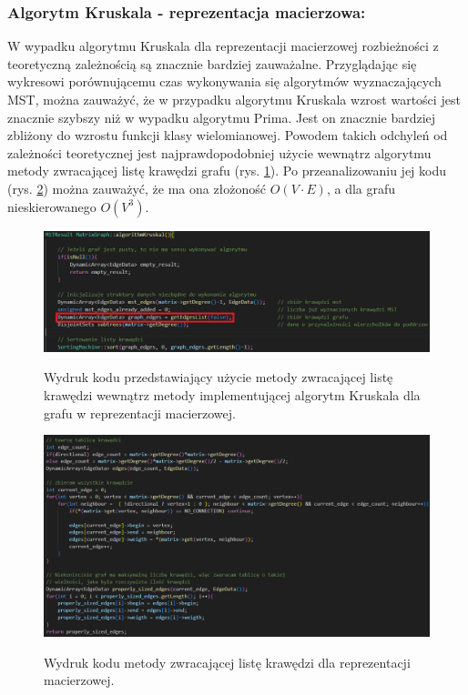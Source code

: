\documentclass[a4paper,12pt]{article}
\begin{document}
\subsubsection{Algorytm Kruskala - reprezentacja macierzowa:}
W wypadku algorytmu Kruskala dla reprezentacji macierzowej rozbieżności z teoretyczną zależnością są znacznie bardziej zauważalne. Przyglądając się wykresowi porównującemu czas wykonywania się algorytmów wyznaczających MST, można zauważyć, że w przypadku algorytmu Kruskala wzrost wartości jest znacznie szybszy niż w wypadku algorytmu Prima. Jest on znacznie bardziej zbliżony do wzrostu funkcji klasy wielomianowej. Powodem takich odchyleń od zależności teoretycznej jest najprawdopodobniej użycie wewnątrz algorytmu metody zwracającej listę krawędzi grafu (rys. \ref{fig.kruskal-macierz-wyjasnienie-1}). Po przeanalizowaniu jej kodu (rys. \ref{fig.kruskal-macierz-wyjasnienie-2}) można zauważyć, że ma ona złożoność $O(V \cdot E)$, a dla grafu nieskierowanego $O(V^3)$.
\begin{figure}[H]
	\centering
	\caption{\centering Wydruk kodu przedstawiający użycie metody zwracającej listę krawędzi wewnątrz metody implementującej algorytm Kruskala dla grafu w reprezentacji macierzowej.}
	\includegraphics[width=14cm]{fig7.png}
	\label{fig.kruskal-macierz-wyjasnienie-1}
\end{figure}

\begin{figure}[H]
	\centering
	\caption{\centering Wydruk kodu metody zwracającej listę krawędzi dla reprezentacji macierzowej.}
	\includegraphics[width=14cm]{fig8.png}
	\label{fig.kruskal-macierz-wyjasnienie-2}
\end{figure}
\end{document}
